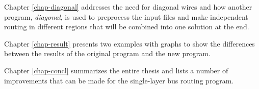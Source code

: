 Chapter \ref{chap-diagonal} addresses the need for diagonal wires and how another program, \textit{diagonal}, is used to preprocess the input files and make independent routing in different regions that will be combined into one solution at the end. 

Chapter \ref{chap-result} presents two examples with graphs to show the differences between the results of the original program and the new program. 

Chapter \ref{chap-concl} summarizes the entire thesis and lists a number of improvements that can be made for the single-layer bus routing program. 


